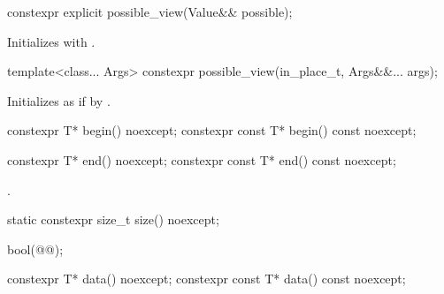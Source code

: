 \begin{itemdecl}
constexpr explicit possible_view(Value&& possible);
\end{itemdecl}

\begin{itemdescr}
\pnum{}
\effects{}
Initializes  with .
\end{itemdescr}

\begin{itemdecl}
template<class... Args>
constexpr possible_view(in_place_t, Args&&... args);
\end{itemdecl}

\begin{itemdescr}
\pnum{}
\effects
Initializes  as if by
.
\end{itemdescr}

\begin{itemdecl}
constexpr T* begin() noexcept;
constexpr const T* begin() const noexcept;
\end{itemdecl}

\begin{itemdescr}
\pnum
\returns
{}
\end{itemdescr}

\begin{itemdecl}
constexpr T* end() noexcept;
constexpr const T* end() const noexcept;
\end{itemdecl}

\begin{itemdescr}
\pnum{}
\returns {}.
\end{itemdescr}

\begin{itemdecl}
static constexpr size_t size() noexcept;
\end{itemdecl}

\begin{itemdescr}
\pnum{}
\returns
\begin{codeblock}
bool(@@);
\end{codeblock}
\end{itemdescr}

\begin{itemdecl}
constexpr T* data() noexcept;
constexpr const T* data() const noexcept;
\end{itemdecl}

\begin{itemdescr}
\pnum{}
\returns {}
\end{itemdescr}

